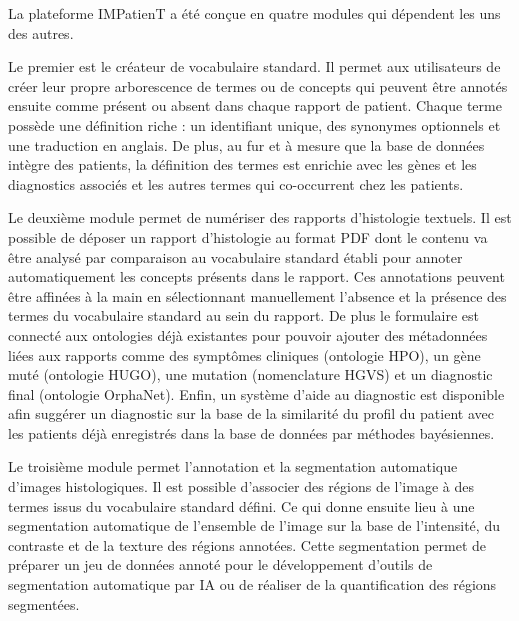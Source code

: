 La plateforme IMPatienT a été conçue en quatre modules qui dépendent les uns des autres.

Le premier est le créateur de vocabulaire standard. Il permet aux utilisateurs de créer leur propre arborescence de termes ou de concepts qui peuvent être annotés ensuite comme présent ou absent dans chaque rapport de patient. Chaque terme possède une définition riche : un identifiant unique, des synonymes optionnels et une traduction en anglais. De plus, au fur et à mesure que la base de données intègre des patients, la définition des termes est enrichie avec les gènes et les diagnostics associés et les autres termes qui co-occurrent chez les patients.

Le deuxième module permet de numériser des rapports d’histologie textuels. Il est possible de déposer un rapport d’histologie au format PDF dont le contenu va être analysé par comparaison au vocabulaire standard établi pour annoter automatiquement les concepts présents dans le rapport. Ces annotations peuvent être affinées à la main en sélectionnant manuellement l’absence et la présence des termes du vocabulaire standard au sein du rapport. De plus le formulaire est connecté aux ontologies déjà existantes pour pouvoir ajouter des métadonnées liées aux rapports comme des symptômes cliniques (ontologie HPO), un gène muté (ontologie HUGO), une mutation (nomenclature HGVS) et un diagnostic final (ontologie OrphaNet). Enfin, un système d’aide au diagnostic est disponible afin suggérer un diagnostic sur la base de la similarité du profil du patient avec les patients déjà enregistrés dans la base de données par méthodes bayésiennes.

Le troisième module permet l’annotation et la segmentation automatique d’images histologiques. Il est possible d’associer des régions de l’image à des termes issus du vocabulaire standard défini. Ce qui donne ensuite lieu à une segmentation automatique de l’ensemble de l’image sur la base de l’intensité, du contraste et de la texture des régions annotées. Cette segmentation permet de préparer un jeu de données annoté pour le développement d’outils de segmentation automatique par IA ou de réaliser de la quantification des régions segmentées.


